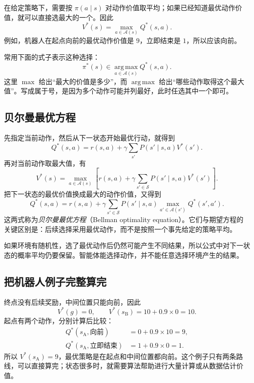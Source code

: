 \documentclass[UTF8,12pt,a4paper,fontset=fandol]{ctexart}
\begin{document}
在给定策略下，需要按 $\pi(a\mid s)$ 对动作价值取平均；如果已经知道最优动作价值，就可以直接选最大的一个。因此
\begin{equation}
  V^*(s)=\max_{a\in\mathcal A(s)}Q^*(s,a).
  \label{eq:mdp-optimal-vq}
\end{equation}
例如，机器人在起点向前的最优动作价值是 $9$，立即结束是 $1$，所以应该向前。

常用下面的式子表示这种选择：
\[
  \pi^*(s)\in\operatorname*{arg\,max}_{a\in\mathcal A(s)}Q^*(s,a).
\]
这里 $\max$ 给出“最大的价值是多少”，而 $\operatorname*{arg\,max}$ 给出“哪些动作取得这个最大值”。写成属于号，是因为多个动作可能并列最好，此时任选其中一个即可。

\subsection{贝尔曼最优方程}

先指定当前动作，然后从下一状态开始最优行动，就得到
\[
  Q^*(s,a)=r(s,a)+\gamma\sum_{s'}P(s'\mid s,a)V^*(s').
\]
再对当前动作取最大值，有
\begin{equation}
  V^*(s)=\max_{a\in\mathcal A(s)}
  \left[r(s,a)+\gamma\sum_{s'\in\mathcal S}P(s'\mid s,a)V^*(s')\right].
  \label{eq:mdp-optimal-bellman-v}
\end{equation}
把下一状态的最优价值换成最大的动作价值，又得到
\begin{equation}
  Q^*(s,a)=r(s,a)+\gamma\sum_{s'\in\mathcal S}P(s'\mid s,a)
  \max_{a'\in\mathcal A(s')}Q^*(s',a').
  \label{eq:mdp-optimal-bellman-q}
\end{equation}
这两式称为\emph{贝尔曼最优方程}（Bellman optimality equation）。它们与期望方程的关键区别是：后续选择采用最优动作，而不是按照一个事先给定的策略平均。

如果环境有随机性，选了最优动作后仍然可能产生不同结果，所以公式中对下一状态的概率平均仍要保留。智能体能选择动作，并不能任意选择环境产生的结果。

\subsection{把机器人例子完整算完}

终点没有后续奖励，中间位置只能向前，因此
\[
  V^*(g)=0,\qquad V^*(s_{\mathrm B})=10+0.9\times0=10.
\]
起点有两个动作，分别计算后比较：
\begin{align*}
  Q^*(s_{\mathrm A},\text{向前})&=0+0.9\times10=9,\\
  Q^*(s_{\mathrm A},\text{立即结束})&=1+0.9\times0=1.
\end{align*}
所以 $V^*(s_{\mathrm A})=9$，最优策略是在起点和中间位置都向前。这个例子只有两条路线，可以直接算完；状态很多时，就需要算法帮助进行大量计算或从数据估计价值。
\end{document}
